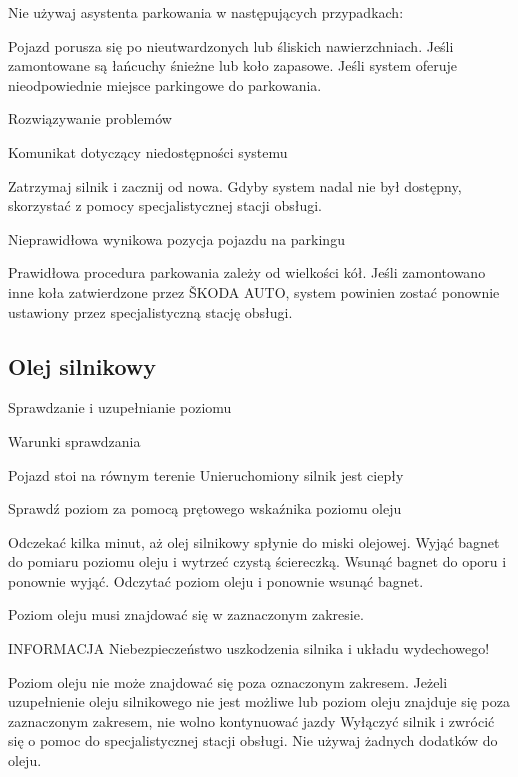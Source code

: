 Nie używaj asystenta parkowania w następujących przypadkach:
\begin{itemizeTriangle}
	\itemTriangle Pojazd porusza się po nieutwardzonych lub śliskich nawierzchniach.
	\itemTriangle Jeśli zamontowane są łańcuchy śnieżne lub koło zapasowe.
	\itemTriangle Jeśli system oferuje nieodpowiednie miejsce parkingowe do parkowania.
\end{itemizeTriangle}

Rozwiązywanie problemów

Komunikat dotyczący niedostępności systemu
\begin{itemizeArrow}
	\itemArrow Zatrzymaj silnik i zacznij od nowa.
	\itemArrow Gdyby system nadal nie był dostępny, skorzystać z pomocy specjalistycznej stacji obsługi.
\end{itemizeArrow}

Nieprawidłowa wynikowa pozycja pojazdu na parkingu

Prawidłowa procedura parkowania zależy od wielkości kół. Jeśli zamontowano inne koła zatwierdzone przez ŠKODA AUTO, system powinien zostać ponownie ustawiony przez specjalistyczną stację obsługi.

\subsection{Olej silnikowy}


Sprawdzanie i uzupełnianie poziomu

Warunki sprawdzania
\begin{itemizeTick}
	\itemTick Pojazd stoi na równym terenie
	\itemTick Unieruchomiony silnik jest ciepły
\end{itemizeTick}

Sprawdź poziom za pomocą prętowego wskaźnika poziomu oleju
\begin{itemizeArrow}
	\itemArrow Odczekać kilka minut, aż olej silnikowy spłynie do miski olejowej.
	\itemArrow Wyjąć bagnet do pomiaru poziomu oleju i wytrzeć czystą ściereczką.
	\itemArrow Wsunąć bagnet do oporu i ponownie wyjąć.
	\itemArrow Odczytać poziom oleju i ponownie wsunąć bagnet.
\end{itemizeArrow}


Poziom oleju musi znajdować się w zaznaczonym zakresie.

INFORMACJA
Niebezpieczeństwo uszkodzenia silnika i układu wydechowego!
\begin{itemizeTriangle}
	\itemTriangle Poziom oleju nie może znajdować się poza oznaczonym zakresem. Jeżeli uzupełnienie oleju silnikowego nie jest możliwe lub poziom oleju znajduje się poza zaznaczonym zakresem, nie wolno kontynuować jazdy Wyłączyć silnik i zwrócić się o pomoc do specjalistycznej stacji obsługi.
	\itemTriangle Nie używaj żadnych dodatków do oleju.
\end{itemizeTriangle}

